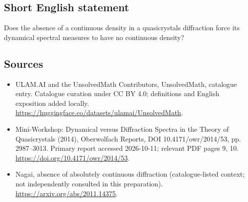 \documentclass[11pt]{article}
\begin{document}
\subsection{Short English statement}
Does the absence of a continuous density in a quasicrystal\textquotesingle s diffraction force its dynamical spectral measures to have no continuous density?
\subsection{Sources}
\begin{itemize}
\item[\hypertarget{source:statement:1}{S1}] ULAM.AI and the UnsolvedMath Contributors, UnsolvedMath, catalogue entry. Catalogue curation under CC BY 4.0; definitions and English exposition added locally.
\url{https://huggingface.co/datasets/ulamai/UnsolvedMath}.
\item[\hypertarget{source:statement:2}{S2}] Mini-Workshop: Dynamical versus Diffraction Spectra in the Theory of Quasicrystals (2014), Oberwolfach Reports, DOI 10.4171/owr/2014/53, pp. 2987--3013. Primary report accessed 2026-10-11; relevant PDF pages 9, 10.
\url{https://doi.org/10.4171/owr/2014/53}.
\item[\hypertarget{source:statement:3}{S3}] Nagai, absence of absolutely continuous diffraction (catalogue-listed context; not independently consulted in this preparation).
\url{https://arxiv.org/abs/2011.14375}.
\end{itemize}
\label{end:statement}
\end{document}
